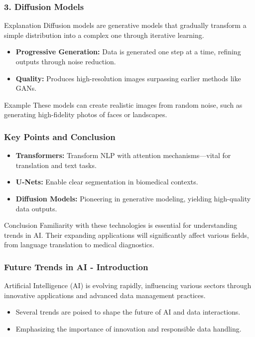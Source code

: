 \documentclass[aspectratio=169]{beamer}
\begin{document}
\begin{frame}[fragile]
    \frametitle{3. Diffusion Models}
    \begin{block}{Explanation}
        Diffusion models are generative models that gradually transform a simple distribution into a complex one through iterative learning.
    \end{block}
    \begin{itemize}
        \item \textbf{Progressive Generation:} Data is generated one step at a time, refining outputs through noise reduction.
        \item \textbf{Quality:} Produces high-resolution images surpassing earlier methods like GANs.
    \end{itemize}
    \begin{block}{Example}
        These models can create realistic images from random noise, such as generating high-fidelity photos of faces or landscapes.
    \end{block}
\end{frame}

\begin{frame}[fragile]
    \frametitle{Key Points and Conclusion}
    \begin{itemize}
        \item \textbf{Transformers:} Transform NLP with attention mechanisms—vital for translation and text tasks.
        \item \textbf{U-Nets:} Enable clear segmentation in biomedical contexts.
        \item \textbf{Diffusion Models:} Pioneering in generative modeling, yielding high-quality data outputs.
    \end{itemize}
    \begin{block}{Conclusion}
        Familiarity with these technologies is essential for understanding trends in AI. Their expanding applications will significantly affect various fields, from language translation to medical diagnostics.
    \end{block}
\end{frame}

\begin{frame}[fragile]
    \frametitle{Future Trends in AI - Introduction}
    Artificial Intelligence (AI) is evolving rapidly, influencing various sectors through innovative applications and advanced data management practices. 
    \begin{itemize}
        \item Several trends are poised to shape the future of AI and data interactions.
        \item Emphasizing the importance of innovation and responsible data handling.
    \end{itemize}
\end{frame}
\end{document}
